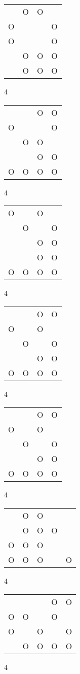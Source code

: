 \begin{tabular}{|m{0.2cm}m{0.2cm}m{0.2cm}m{0.2cm}|}\hline
 &O&O& \\
O& & &O\\
O& & &O\\
 &O&O&O\\
 &O&O&O\\
\hline\end{tabular}4
\begin{tabular}{|m{0.2cm}m{0.2cm}m{0.2cm}m{0.2cm}|}\hline
 & &O&O\\
O& & &O\\
 &O&O& \\
 & &O&O\\
O&O&O&O\\
\hline\end{tabular}4
\begin{tabular}{|m{0.2cm}m{0.2cm}m{0.2cm}m{0.2cm}|}\hline
O& &O& \\
 &O& &O\\
 & &O&O\\
 & &O&O\\
O&O&O&O\\
\hline\end{tabular}4
\begin{tabular}{|m{0.2cm}m{0.2cm}m{0.2cm}m{0.2cm}|}\hline
 & &O&O\\
O& &O& \\
 &O& &O\\
 & &O&O\\
O&O&O&O\\
\hline\end{tabular}4
\begin{tabular}{|m{0.2cm}m{0.2cm}m{0.2cm}m{0.2cm}|}\hline
 & &O&O\\
O& &O& \\
 &O& &O\\
 & &O&O\\
O&O&O&O\\
\hline\end{tabular}4
\begin{tabular}{|m{0.2cm}m{0.2cm}m{0.2cm}m{0.2cm}m{0.2cm}|}\hline
 &O&O& & \\
 &O&O&O& \\
O&O&O& & \\
O&O&O& &O\\
\hline\end{tabular}4
\begin{tabular}{|m{0.2cm}m{0.2cm}m{0.2cm}m{0.2cm}m{0.2cm}|}\hline
 & & &O&O\\
O&O& &O& \\
O& &O& &O\\
 &O&O&O&O\\
\hline\end{tabular}4

